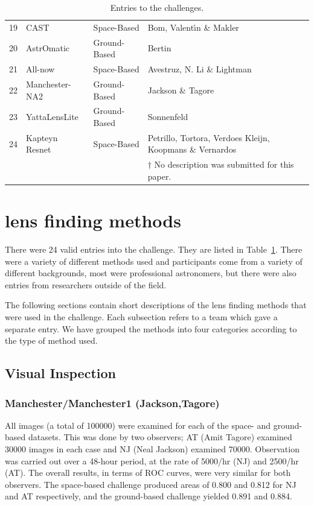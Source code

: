 \documentclass{aa}
\begin{document}
\begin{table}
\begin{tabular}{rlll}
  19 & CAST & Space-Based & Bom, Valent\'{\i}n \& Makler  \\ 
  20 & AstrOmatic & Ground-Based & Bertin  \\ 
  21 & All-now & Space-Based & Avestruz, N. Li \& Lightman   \\ 
  22 & Manchester-NA2 & Ground-Based & Jackson \& Tagore  \\ 
  23 & YattaLensLite & Ground-Based & Sonnenfeld   \\ 
  24 & Kapteyn Resnet & Space-Based & Petrillo, Tortora, Verdoes Kleijn, Koopmans \& Vernardos \\ 
   \hline
   & & &$\dagger$ No description was submitted for this paper.
\end{tabular}
\caption{Entries to the challenges.}
\label{table:entries}
\end{table}

\section{lens finding methods}
\label{sec:methods}

There were 24 valid entries into the challenge.  They are listed in Table~\ref{table:entries}.  There were a variety of different methods used and participants come from a variety of different backgrounds, most were professional astronomers, but there were also entries from researchers outside of the field.  

The following sections contain short descriptions of the lens finding methods that were used in 
the challenge.  Each subsection refers to a team which gave a separate entry.  We have grouped the 
methods into four categories according to the type of method used.

\subsection{Visual Inspection}
\subsubsection{Manchester/Manchester1 (Jackson,Tagore)}

All images (a total of 100000) were examined for each of the space- and
ground-based datasets. This was done by two observers; AT (Amit Tagore) examined 30000
images in each case and NJ (Neal Jackson) examined 70000. Observation was carried out
over a 48-hour period, at the rate of 5000/hr (NJ) and 2500/hr (AT). 
The overall results, in terms of ROC curves, were very similar for 
both observers. The space-based challenge produced areas of 0.800 and 
0.812 for NJ and AT respectively, and the ground-based challenge yielded 
0.891 and 0.884.
\end{document}
